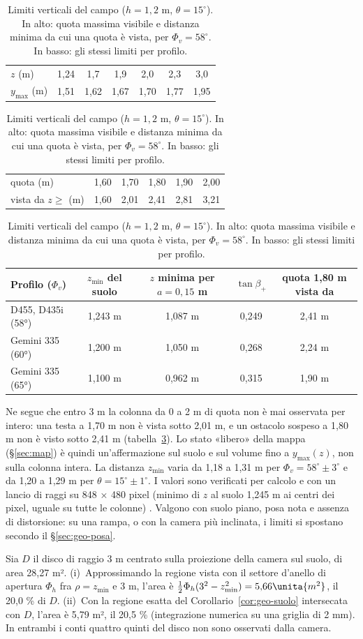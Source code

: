 \begin{table}[htb]\centering\small
\caption{Limiti verticali del campo ($h=1{,}2$ m, $\theta=15^\circ$). In alto: quota massima visibile e distanza minima da cui una quota è vista, per $\Phi_v=58^\circ$. In basso: gli stessi limiti per profilo. }\label{tab:geo-verticale}
\begin{tabular}{@{}lcccccc@{}}
\toprule
$z$ (m) & 1,24 & 1,7 & 1,9 & 2,0 & 2,3 & 3,0\\
$y_{\max}$ (m) & 1,51 & 1,62 & 1,67 & 1,70 & 1,77 & 1,95\\
\bottomrule
\end{tabular}\qquad
\begin{tabular}{@{}lccccc@{}}
\toprule
quota (m) & 1,60 & 1,70 & 1,80 & 1,90 & 2,00\\
vista da $z\ge$ (m) & 1,60 & 2,01 & 2,41 & 2,81 & 3,21\\
\bottomrule
\end{tabular}

\smallskip
\begin{tabular}{@{}lcccc@{}}
\toprule
Profilo ($\Phi_v$) & $z_{\min}$ del suolo & $z$ minima per $a=0{,}15$ m & $\tan\beta_+$ & quota 1,80 m vista da\\
\midrule
D455, D435i (58°) & 1,243 m & 1,087 m & 0,249 & 2,41 m\\
Gemini 335 (60°) & 1,200 m & 1,050 m & 0,268 & 2,24 m\\
Gemini 335 (65°) & 1,100 m & 0,962 m & 0,315 & 1,90 m\\
\bottomrule
\end{tabular}
\end{table}

Ne segue che entro 3 m la colonna da 0 a 2 m di quota non è mai osservata per intero: una testa a 1,70 m non è vista sotto 2,01 m, e un ostacolo sospeso a 1,80 m non è visto sotto 2,41 m (tabella~\ref{tab:geo-verticale}). Lo stato «libero» della mappa (\S\ref{sec:map}) è quindi un'affermazione sul suolo e sul volume fino a $y_{\max}(z)$, non sulla colonna intera. La distanza $z_{\min}$ varia da 1,18 a 1,31 m per $\Phi_v=58^\circ\pm3^\circ$ e da 1,20 a 1,29 m per $\theta=15^\circ\pm1^\circ$. I valori sono verificati per calcolo e con un lancio di raggi su 848 × 480 pixel (minimo di $z$ al suolo 1,245 m ai centri dei pixel, uguale su tutte le colonne) . Valgono con suolo piano, posa nota e assenza di distorsione: su una rampa, o con la camera più inclinata, i limiti si spostano secondo il \S\ref{sec:geo-posa}.

\begin{proposizione}\label{prop:geo-disco}
Sia $D$ il disco di raggio 3 m centrato sulla proiezione della camera sul suolo, di area 28,27 m². (i)~Approssimando la regione vista con il settore d'anello di apertura $\Phi_h$ fra $\rho=z_{\min}$ e 3 m, l'area è $\tfrac12\Phi_h(3^2-z_{\min}^2)=5{,}66\unita{m^2}$, il 20,0 \% di $D$. (ii)~Con la regione esatta del Corollario~\ref{cor:geo-suolo} intersecata con $D$, l'area è 5,79 m², il 20,5 \% (integrazione numerica su una griglia di 2 mm). In entrambi i conti quattro quinti del disco non sono osservati dalla camera. 
\end{proposizione}

